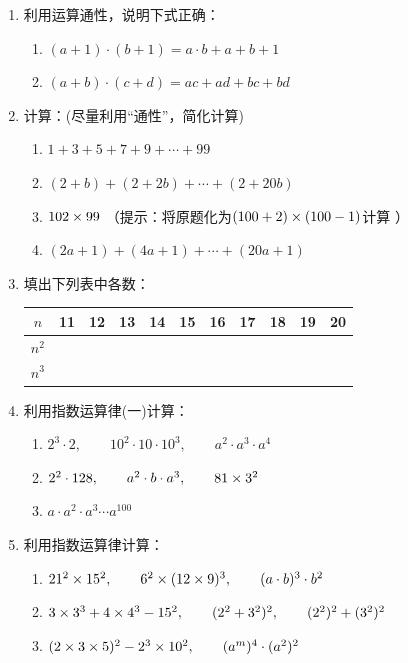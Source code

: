 \begin{enumerate}
	\item 利用运算通性，说明下式正确：
	\begin{enumerate}
		\item $(a+1)\cdot (b+1)=a\cdot b+a+b+1$
		\item $(a+b)\cdot (c+d)=ac+ad+bc+bd$
	\end{enumerate}
	
	\item 计算：(尽量利用“通性”，简化计算)
	\begin{enumerate}
		\item $1+3+5+7+9+\cdots+99$
		\item $(2+b)+(2+2b)+\cdots+(2+20b)$
		\item $102\times 99$ （提示：将原题化为$(100+2)\times(100-1)$计算 ）
		\item $(2a+1)+(4a+1)+\cdots +(20a+1)$
	\end{enumerate}
	
	\item 填出下列表中各数：
	\begin{center}
		\begin{tabular}{c|cccccccccc}
			\hline
			$n$ & 11&12&13&14&15&16&17&18&19&20\\
			\hline
			$n^2$\\
			$n^3$\\
			\hline
		\end{tabular}
	\end{center}
	
	\item 利用指数运算律(一)计算：
	\begin{enumerate}
		\item $2^3\cdot 2,\qquad 10^2\cdot 10\cdot 10^3,\qquad a^2\cdot a^3\cdot a^4$
		\item $2^2\cdot 128,\qquad a^2\cdot b\cdot a^3,\qquad 81\times 3^2$
		\item $a\cdot a^2\cdot a^3\cdots a^{100}$
	\end{enumerate}
	
	\item 利用指数运算律计算：
	\begin{enumerate}
		\item $21^2\times 15^2,\qquad 6^2\times(12\times 9)^3,\qquad (a\cdot b)^3\cdot b^2$
		\item $3\times 3^3+4\times 4^3-15^2,\qquad (2^2+3^2)^2,\qquad (2^2)^2+(3^2)^2$
		\item $(2\times3\times5)^2-2^3\times10^2,\qquad (a^m)^4\cdot (a^2)^2$
	\end{enumerate}
	

\end{enumerate}
